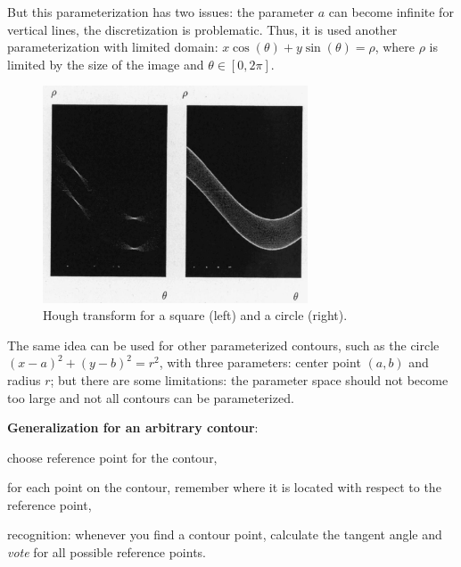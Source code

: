 But this parameterization has two issues: the parameter $a$ can become infinite for vertical lines, the discretization is problematic. Thus, it is used another parameterization with limited domain: $x \cos(\theta) + y \sin(\theta) = \rho$, where $\rho$ is limited by the size of the image and $\theta \in [0, 2 \pi]$.

\begin{figure}[!h]
    \centering
    \includegraphics[width=0.7\textwidth]{images/hough-transform}
    \caption[Hough transform]{Hough transform for a square (left) and a circle (right).}
    \label{fig:hough-transform}
\end{figure}

The same idea can be used for other parameterized contours, such as the circle $(x-a)^2 + (y-b)^2 = r^2$, with three parameters: center point $(a, b)$ and radius $r$; but there are some limitations: the parameter space should not become too large and not all contours can be parameterized.

\textbf{Generalization for an arbitrary contour}:
\begin{myitem}
    \item choose reference point for the contour,
    \item for each point on the contour, remember where it is located with respect to the reference point,
    \item recognition: whenever you find a contour point, calculate the tangent angle and \textit{vote} for all possible reference points.
\end{myitem}

